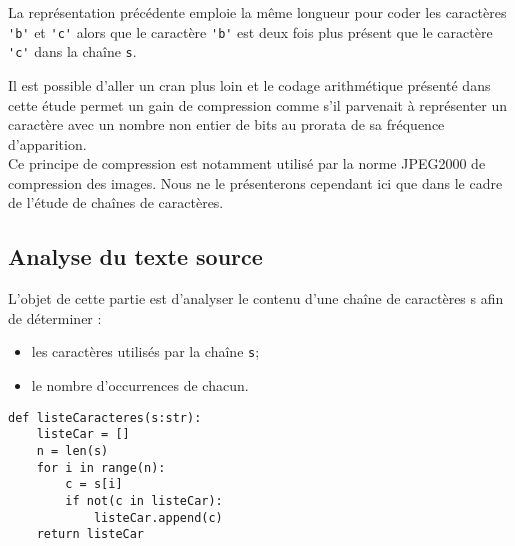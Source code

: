 
La représentation précédente emploie la même longueur pour coder les caractères \lstinline{'b'} et \lstinline{'c'} alors que le caractère \lstinline{'b'} est deux fois plus présent que le caractère \lstinline{'c'} dans la chaîne \lstinline{s}.

Il est possible d'aller un cran plus loin et le codage arithmétique présenté dans cette étude permet un gain de compression comme s'il parvenait à représenter un caractère avec un nombre non entier de bits au prorata de sa fréquence d'apparition.\\
Ce principe de compression est notamment utilisé par la norme JPEG2000 de compression des images. Nous ne le présenterons cependant ici que dans le cadre de l'étude de chaînes de caractères.

\subsection{Analyse du texte source}
L'objet de cette partie est d'analyser le contenu d'une chaîne de caractères s afin de déterminer :

\begin{itemize}
  \item les caractères utilisés par la chaîne \lstinline{s};
  \item le nombre d'occurrences de chacun.
\end{itemize}



\begin{lstlisting}
def listeCaracteres(s:str):
    listeCar = []
    n = len(s)
    for i in range(n):
        c = s[i]
        if not(c in listeCar):
            listeCar.append(c)
    return listeCar
\end{lstlisting}

